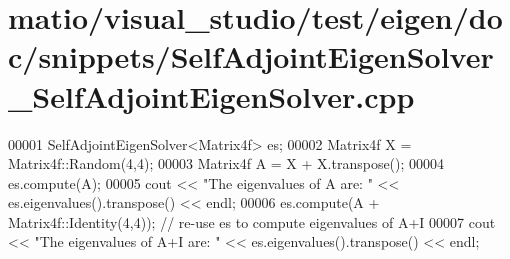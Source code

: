 \hypertarget{matio_2visual__studio_2test_2eigen_2doc_2snippets_2_self_adjoint_eigen_solver___self_adjoint_eigen_solver_8cpp_source}{}\section{matio/visual\+\_\+studio/test/eigen/doc/snippets/\+Self\+Adjoint\+Eigen\+Solver\+\_\+\+Self\+Adjoint\+Eigen\+Solver.cpp}
\label{matio_2visual__studio_2test_2eigen_2doc_2snippets_2_self_adjoint_eigen_solver___self_adjoint_eigen_solver_8cpp_source}

\begin{DoxyCode}
00001 SelfAdjointEigenSolver<Matrix4f> es;
00002 Matrix4f X = Matrix4f::Random(4,4);
00003 Matrix4f A = X + X.transpose();
00004 es.compute(A);
00005 cout << \textcolor{stringliteral}{"The eigenvalues of A are: "} << es.eigenvalues().transpose() << endl;
00006 es.compute(A + Matrix4f::Identity(4,4)); \textcolor{comment}{// re-use es to compute eigenvalues of A+I}
00007 cout << \textcolor{stringliteral}{"The eigenvalues of A+I are: "} << es.eigenvalues().transpose() << endl;
\end{DoxyCode}

